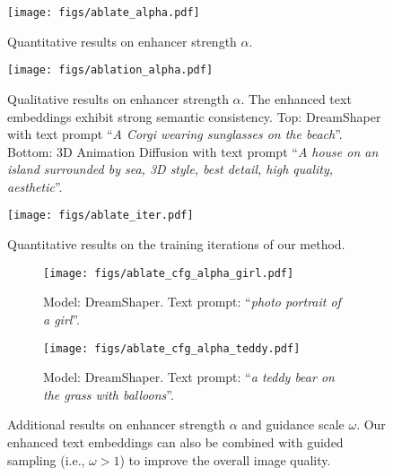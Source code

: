 \begin{figure}[t]
\begin{center}
\texttt{[image: figs/ablate\_alpha.pdf]}
\caption{Quantitative results on enhancer strength $\alpha$.}
\label{fig:ablation_alpha}
\end{center}
\end{figure}


\begin{figure}[t]
\begin{center}
    \texttt{[image: figs/ablation\_alpha.pdf]}
    \vskip -0.1in
    \caption{Qualitative results on enhancer strength $\alpha$. The enhanced text embeddings exhibit strong semantic consistency. 
    Top: DreamShaper with text prompt ``\textit{A Corgi wearing sunglasses on the beach}''.
    Bottom: 3D Animation Diffusion with text prompt
    ``\textit{A house on an island surrounded by sea, 3D style, best detail, high quality, aesthetic}''.}
    \label{fig:ablation_alpha_qualitative}
\end{center}
\end{figure}


\begin{figure}[t]
\begin{center}
\texttt{[image: figs/ablate\_iter.pdf]}
\caption{Quantitative results on the training iterations of our method.}
\label{fig:ablation_iter}
\end{center}
\end{figure}

\begin{figure}[t]
\begin{center}
    \begin{subfigure}[t]{0.9\textwidth}
        \texttt{[image: figs/ablate\_cfg\_alpha\_girl.pdf]}
        \caption{Model: DreamShaper. Text prompt: ``\textit{photo portrait of a girl}''.}
    \end{subfigure}
    \vskip 0.15in
    \begin{subfigure}[t]{0.9\textwidth}
        \texttt{[image: figs/ablate\_cfg\_alpha\_teddy.pdf]}
        \caption{Model: DreamShaper. Text prompt: ``\textit{a teddy bear on the grass with balloons}''.}
    \end{subfigure}
\caption{Additional results on enhancer strength $\alpha$ and guidance scale $\omega$. Our enhanced text embeddings can also be combined with guided sampling (i.e., $\omega > 1$) to improve the overall image quality.}
\label{fig:ablate_cfg_alpha}
\end{center}
\end{figure}


